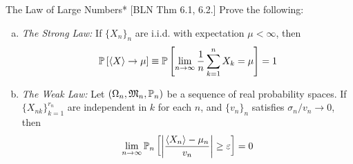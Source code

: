 \begin{problem}{The Law of Large Numbers}*
    [BLN Thm 6.1, 6.2.] Prove the following: 
    \begin{enumerate}[(a)]
        \itemsep0em
        \item \emph{The Strong Law:} If $\{X_n\}_n$ are i.i.d. with expectation $\mu < \infty$, then 
        $$
            \bb{P}\left[\ev{X} \to \mu\right]
            \equiv \bb{P}\left[ \lim_{n \to \infty} \frac{1}{n} \sum_{k=1}^n X_k = \mu \right] 
            = 1
        $$
        \item \emph{The Weak Law:} Let $(\Omega_n, \mathfrak{M}_n, \mathbb{P}_n)$ be a sequence of real probability spaces. If $\{X_{nk}\}_{k=1}^{r_n}$ are independent in $k$ for each $n$, and $\{v_n\}_n$ satisfies $\sigma_n / v_n \to 0$, then 
        $$
            \lim_{n \to \infty} \bb{P}_n \left[ \left| \frac{\ev{X_n} - \mu_n}{v_n} \right| \geq \varepsilon \right] = 0
        $$
    \end{enumerate}
\end{problem}




